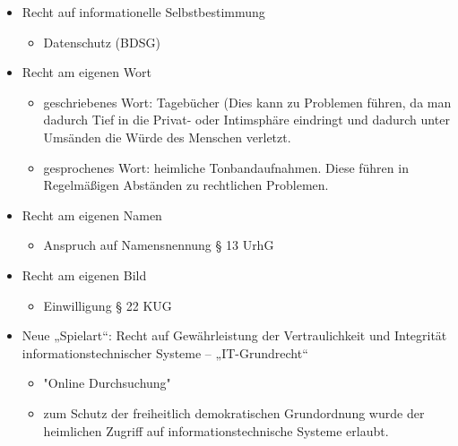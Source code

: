 \begin{itemize}
    \item Recht auf informationelle Selbstbestimmung
    \begin{itemize}
        \item Datenschutz (BDSG)
    \end{itemize}
    \item Recht am eigenen Wort
    \begin{itemize}
        \item geschriebenes Wort: Tagebücher (Dies kann zu Problemen führen, da man dadurch Tief in die Privat- oder Intimsphäre eindringt und dadurch unter Umsänden die Würde des Menschen verletzt.
        \item gesprochenes Wort: heimliche Tonbandaufnahmen. Diese führen in Regelmäßigen Abständen zu rechtlichen Problemen. 
    \end{itemize}
    \item Recht am eigenen Namen
    \begin{itemize}
        \item Anspruch auf Namensnennung § 13 UrhG
    \end{itemize}
    \item Recht am eigenen Bild
    \begin{itemize}
        \item Einwilligung § 22 KUG
    \end{itemize}
    \item Neue „Spielart“: Recht auf Gewährleistung der Vertraulichkeit und Integrität informationstechnischer Systeme – „IT-Grundrecht“
    \begin{itemize}
        \item "Online Durchsuchung"
        \item zum Schutz der freiheitlich demokratischen Grundordnung wurde der heimlichen Zugriff auf informationstechnische Systeme erlaubt.
    \end{itemize}
\end{itemize}
%
%
%

